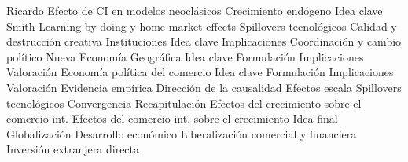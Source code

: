 \documentclass{nuevotema}
\begin{document}
\begin{esquema}[enumerate]
			\3 Ricardo
			\3 Efecto de CI en modelos neoclásicos
		\2 Crecimiento endógeno
			\3 Idea clave
			\3 Smith
			\3 Learning-by-doing y home-market effects
			\3 Spillovers tecnológicos
			\3 Calidad y destrucción creativa
		\2 Instituciones
			\3 Idea clave
			\3 Implicaciones
			\3 Coordinación y cambio político
		\2 Nueva Economía Geográfica
			\3 Idea clave
			\3 Formulación
			\3 Implicaciones
			\3 Valoración
		\2 Economía política del comercio
			\3 Idea clave
			\3 Formulación
			\3 Implicaciones
			\3 Valoración
		\2 Evidencia empírica
			\3 Dirección de la causalidad
			\3 Efectos escala
			\3 Spillovers tecnológicos
			\3 Convergencia
	\1[] 
		\2 Recapitulación
			\3 Efectos del crecimiento sobre el comercio int.
			\3 Efectos del comercio int. sobre el crecimiento
		\2 Idea final
			\3 Globalización
			\3 Desarrollo económico
			\3 Liberalización comercial y financiera
			\3 Inversión extranjera directa

\end{esquema}

\esquemalargo
\end{document}
